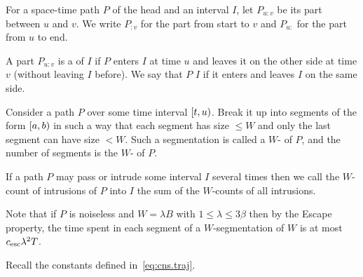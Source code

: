 \documentclass[11pt]{memoir}
\theoremstyle{definition} %
\renewcommand{\le}{\leq}
\def\B{B}
\newcommand{\Tu}{T}
\newcommand{\cns}[1]{c_{\textrm{\upshape #1}}}
\newcommand{\CEsc}{\cns{esc}}
\begin{document}
\begin{definition}
  For a space-time path \( P \) of the head and an interval \( I \),
let \( P_{u:v} \) be its part between \( u \) and \( v \).
We write \( P_{:v} \) for the part from start to \( v \) and \( P_{u:} \)
for the part from \( u \) to end.

A part \( P_{u:v} \)
is a  of \( I \) if \( P \) enters \( I \) at time \( u \) and leaves it on the other side
at time \( v \) (without leaving \( I \) before).
We say that \( P \)  \( I \) if it enters and leaves \( I \) on the same side.
\end{definition}


\begin{definition}
  Consider a path \( P \) over some time interval \( \left[t,u\right) \).
  Break it up into segments of the form \( \left[a,b\right) \) in such a way
  that each segment has size \( \le W \) and only the last segment can have size \( <W \).
  Such a segmentation is called a \( W \)- of \( P \), and the
  number of segments is the \( W \)- of \( P \).
  
  If a path \( P \) may pass or intrude some interval \( I \) several times then
  we call the \( W \)-count of intrusions of \( P \) into \( I \) the sum of the \( W \)-counts
  of all intrusions.
\end{definition}

Note that if \( P \) is noiseless and \( W=\lambda\B \) with \( 1\le \lambda\le 3\beta \) then
by the Escape property,
the time spent in each segment of a \( W \)-segmentation of \( W \) is at most \( \CEsc\lambda^{2}\Tu \).

Recall the constants defined in~\eqref{eq:cns.traj}.
\end{document}

